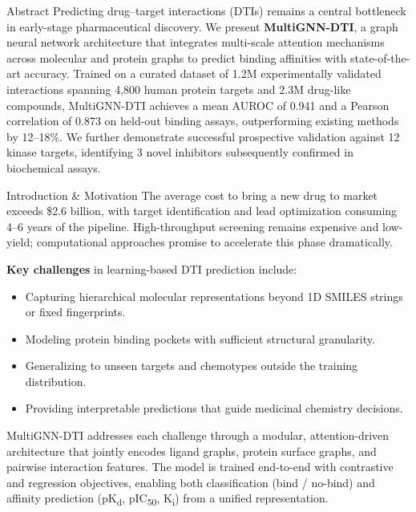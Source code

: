 \documentclass[20pt,landscape]{extarticle}
\begin{document}
\begin{minipage}[t]{0.325\textwidth}
\RaggedRight

\begin{posterblock}{Abstract}
Predicting drug--target interactions (DTIs) remains a central bottleneck in early-stage pharmaceutical discovery.
We present \textbf{MultiGNN-DTI}, a graph neural network architecture that integrates multi-scale attention mechanisms
across molecular and protein graphs to predict binding affinities with state-of-the-art accuracy. Trained on a curated
dataset of 1.2M experimentally validated interactions spanning 4,800 human protein targets and 2.3M drug-like compounds,
MultiGNN-DTI achieves a mean AUROC of 0.941 and a Pearson correlation of 0.873 on held-out binding assays,
outperforming existing methods by 12--18\%. We further demonstrate successful prospective validation against
12 kinase targets, identifying 3 novel inhibitors subsequently confirmed in biochemical assays.
\end{posterblock}

\begin{posterblockteal}{Introduction \& Motivation}
The average cost to bring a new drug to market exceeds \$2.6 billion, with target identification and
lead optimization consuming 4--6 years of the pipeline. High-throughput screening remains expensive and
low-yield; computational approaches promise to accelerate this phase dramatically.

\textbf{Key challenges} in learning-based DTI prediction include:
\begin{itemize}
  \item Capturing hierarchical molecular representations beyond 1D SMILES strings or fixed fingerprints.
  \item Modeling protein binding pockets with sufficient structural granularity.
  \item Generalizing to unseen targets and chemotypes outside the training distribution.
  \item Providing interpretable predictions that guide medicinal chemistry decisions.
\end{itemize}

MultiGNN-DTI addresses each challenge through a modular, attention-driven architecture that jointly
encodes ligand graphs, protein surface graphs, and pairwise interaction features. The model is trained
end-to-end with contrastive and regression objectives, enabling both classification (bind / no-bind)
and affinity prediction (pK\textsubscript{d}, pIC\textsubscript{50}, K\textsubscript{i}) from a unified representation.
\end{posterblockteal}


\end{minipage}
\end{document}
